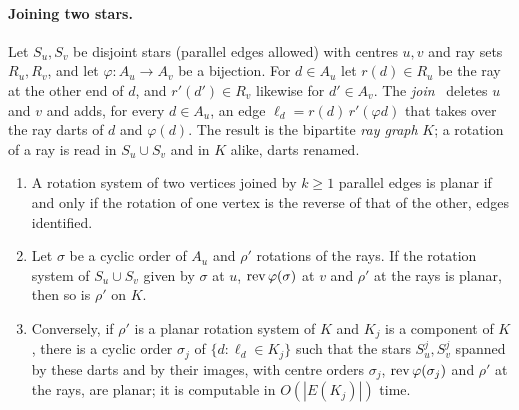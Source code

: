 \paragraph{Joining two stars.}
Let $S_u,S_v$ be disjoint stars (parallel edges allowed) with centres $u,v$
and ray sets $R_u,R_v$, and let $\varphi:A_u\to A_v$ be a bijection. For
$d\in A_u$ let $r(d)\in R_u$ be the ray at the other end of $d$, and
$r'(d')\in R_v$ likewise for $d'\in A_v$. The
\emph{join}~\cite[Section~2]{BFR21} deletes $u$ and $v$ and adds, for every
$d\in A_u$, an edge $\ell_d=r(d)\,r'(\varphi d)$ that takes over the ray
darts of $d$ and $\varphi(d)$. The result is the bipartite \emph{ray graph}
$K$; a rotation of a ray is read in $S_u\cup S_v$ and in $K$ alike, darts
renamed.

\begin{lemma}[stars]\label{lem:eng4-stars}
\begin{enumerate}[label=(\alph*),nosep]
\item A rotation system of two vertices joined by $k\ge1$ parallel edges is
  planar if and only if the rotation of one vertex is the reverse of that of
  the other, edges identified.
\item Let $\sigma$ be a cyclic order of $A_u$ and $\rho'$ rotations of the
  rays. If the rotation system of $S_u\cup S_v$ given by $\sigma$ at $u$,
  $\operatorname{rev}\varphi(\sigma)$ at $v$ and $\rho'$ at the rays is planar, then so
  is $\rho'$ on $K$.
\item Conversely, if $\rho'$ is a planar rotation system of $K$ and $K_j$ is
  a component of $K$, there is a cyclic order $\sigma_j$ of
  $\{d:\ell_d\in K_j\}$ such that the stars $S^j_u,S^j_v$ spanned by these
  darts and by their images, with centre orders $\sigma_j$,
  $\operatorname{rev}\varphi(\sigma_j)$ and $\rho'$ at the rays, are planar; it is
  computable in $O(|E(K_j)|)$ time.
\end{enumerate}
\end{lemma}

